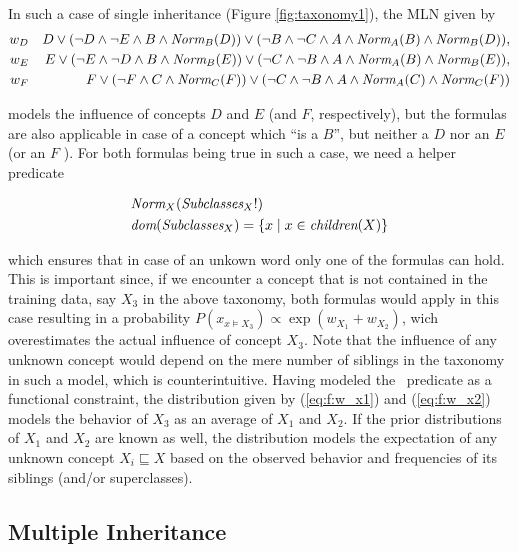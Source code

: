 \documentclass[12pt,a4paper]{article}
\begin{document}
In such a case of single inheritance (Figure \ref{fig:taxonomy1}), the MLN given by
\begin{eqnarray}
	w_{D} & &D\lor (\lnot D\land\lnot E\land B\land\textit{Norm}_B(D))\lor (\lnot B\land\lnot C\land A\land\textit{Norm}_A(B)\land\textit{Norm}_B(D)),\label{eq:f:w_x1}\nonumber\\
	w_{E} & &E\lor (\lnot E\land\lnot D\land B\land\textit{Norm}_B(E))\lor (\lnot C\land\lnot B\land A\land\textit{Norm}_A(B)\land\textit{Norm}_B(E)),\label{eq:f:w_x2}\nonumber\\
	w_{F} & &F\lor (\lnot F\land C\land\textit{Norm}_C(F))\lor (\lnot C\land\lnot B\land A\land\textit{Norm}_A(C)\land\textit{Norm}_C(F))\nonumber
\end{eqnarray}

models the influence of concepts $D$ and $E$ (and $F$, 
respectively), but the formulas are also applicable in case of a 
concept which ``is a $B$'', but neither a $D$ nor an $E$ (or an $F$
). For both formulas being true in such a case, we need a helper 
predicate

\begin{eqnarray}
    &\textit{Norm}_X(\textit{Subclasses}_X!)\nonumber\\
    &\textit{dom}(\textit{Subclasses}_X)=\{x\mid x\in\textit{children}(X)\}\nonumber
\end{eqnarray}

which ensures that in case of an unkown word only one of the 
formulas can hold. This is important since, if we encounter a 
concept that is not contained in the training data, say $X_3$ in the 
above taxonomy, both formulas would apply in this case resulting in 
a probability $P(x_{x\models X_3})\propto \exp({w_{X_1}+w_{X_2}})$, 
wich overestimates the actual influence of concept $X_3$. Note that 
the influence of any unknown concept would depend on the mere number 
of siblings in the taxonomy in such a model, which is 
counterintuitive. Having modeled the \norm\ predicate as a 
functional constraint, the distribution given by (\ref{eq:f:w_x1}) 
and (\ref {eq:f:w_x2}) models the behavior of $X_3$ as an average of 
$X_1$ and $X_2$. If the prior distributions of $X_1$ and $X_2$ are 
known as well, the distribution models the expectation of any 
unknown concept $X_i\sqsubseteq X$ based on the observed behavior 
and frequencies of its siblings (and/or superclasses).

\subsection{Multiple Inheritance}
\end{document}
